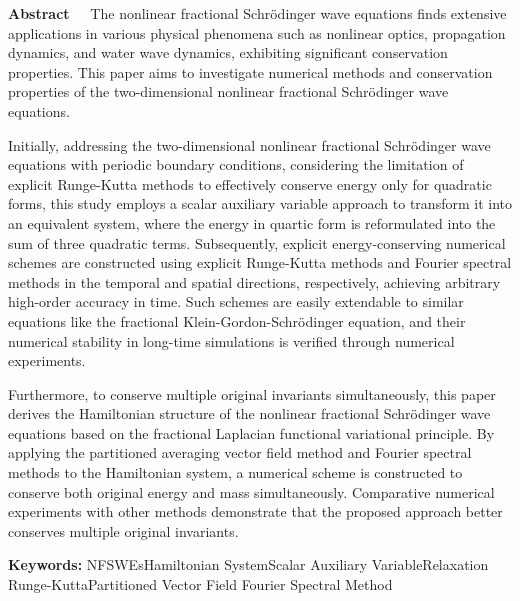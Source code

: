 \begin{EnglishAbstract}
\item {\bf Abstract\ \ } 
The nonlinear fractional Schr{\"o}dinger wave equations finds extensive applications in various physical phenomena such as nonlinear optics, propagation dynamics, and water wave dynamics, exhibiting significant conservation properties. This paper aims to investigate numerical methods and conservation properties of the two-dimensional nonlinear fractional Schr{\"o}dinger wave equations.

Initially, addressing the two-dimensional nonlinear fractional Schr{\"o}dinger wave equations with periodic boundary conditions, considering the limitation of explicit Runge-Kutta methods to effectively conserve energy only for quadratic forms, this study employs a scalar auxiliary variable approach to transform it into an equivalent system, where the energy in quartic form is reformulated into the sum of three quadratic terms. Subsequently, explicit energy-conserving numerical schemes are constructed using explicit Runge-Kutta methods and Fourier spectral methods in the temporal and spatial directions, respectively, achieving arbitrary high-order accuracy in time. Such schemes are easily extendable to similar equations like the fractional Klein-Gordon-Schr{\"o}dinger equation, and their numerical stability in long-time simulations is verified through numerical experiments.

Furthermore, to conserve multiple original invariants simultaneously, this paper derives the Hamiltonian structure of the nonlinear fractional Schr{\"o}dinger wave equations based on the fractional Laplacian functional variational principle. By applying the partitioned averaging vector field method and Fourier spectral methods to the Hamiltonian system, a numerical scheme is constructed to conserve both original energy and mass simultaneously. Comparative numerical experiments with other methods demonstrate that the proposed approach better conserves multiple original invariants.
\item {\bf Keywords:} NFSWEs\qquad Hamiltonian System\qquad Scalar Auxiliary Variable\qquad Relaxation Runge-Kutta\qquad Partitioned Vector Field \qquad Fourier Spectral Method
\end{EnglishAbstract}